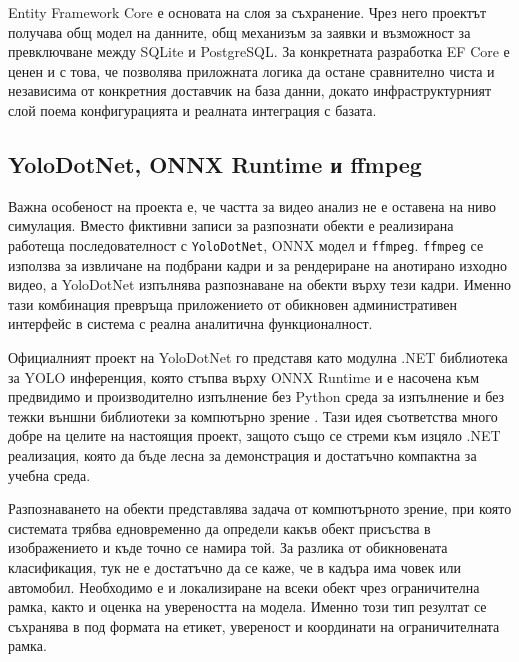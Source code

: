 Entity Framework Core е основата на слоя за съхранение. Чрез него проектът получава общ модел на данните, общ механизъм за заявки и възможност за превключване между SQLite и PostgreSQL. За конкретната разработка EF Core е ценен и с това, че позволява приложната логика да остане сравнително чиста и независима от конкретния доставчик на база данни, докато инфраструктурният слой поема конфигурацията и реалната интеграция с базата.

\subsection{YoloDotNet, ONNX Runtime и ffmpeg}

Важна особеност на проекта е, че частта за видео анализ не е оставена на ниво симулация. Вместо фиктивни записи за разпознати обекти е реализирана работеща последователност с \texttt{YoloDotNet}, ONNX модел и \texttt{ffmpeg}. \texttt{ffmpeg} се използва за извличане на подбрани кадри и за рендериране на анотирано изходно видео, а YoloDotNet изпълнява разпознаване на обекти върху тези кадри. Именно тази комбинация превръща приложението от обикновен административен интерфейс в система с реална аналитична функционалност.

Официалният проект на YoloDotNet го представя като модулна .NET библиотека за YOLO инференция, която стъпва върху ONNX Runtime и е насочена към предвидимо и производително изпълнение без Python среда за изпълнение и без тежки външни библиотеки за компютърно зрение \cite{yolodotnet}. Тази идея съответства много добре на целите на настоящия проект, защото \projectname{} също се стреми към изцяло .NET реализация, която да бъде лесна за демонстрация и достатъчно компактна за учебна среда.

Разпознаването на обекти представлява задача от компютърното зрение, при която системата трябва едновременно да определи какъв обект присъства в изображението и къде точно се намира той. За разлика от обикновената класификация, тук не е достатъчно да се каже, че в кадъра има човек или автомобил. Необходимо е и локализиране на всеки обект чрез ограничителна рамка, както и оценка на увереността на модела. Именно този тип резултат се съхранява в \projectname{} под формата на етикет, увереност и координати на ограничителната рамка.


